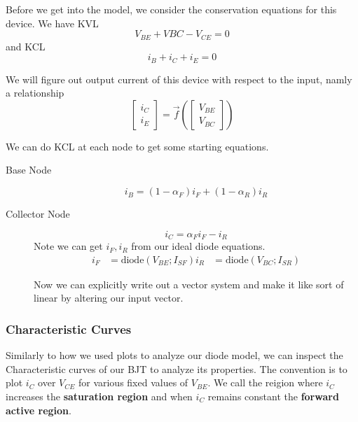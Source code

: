 \documentclass{report}
\begin{document}

Before we get into the model, we consider the conservation equations for this device. We have KVL
\begin{equation*}
    V_{BE} + V{BC} - V_{CE} = 0 %
\end{equation*}
and KCL
\begin{equation*}
    i_B + i_C + i_E = 0
\end{equation*}

We will figure out output current of this device with respect to the input, namly a relationship
\begin{equation*}
    \begin{bmatrix}
        i_C \\
        i_E
    \end{bmatrix}
    = \vec{f}
    (\begin{bmatrix}
        V_{BE} \\
        V_{BC}
    \end{bmatrix})
\end{equation*}


We can do KCL at each node to get some starting equations.

\begin{description}
    \item[Base Node] 
    \begin{equation*}
        i_B = (1 - \alpha_F)i_F + (1 - \alpha_R)i_R
    \end{equation*}
    \item[Collector Node] 
    \begin{equation*}
        i_C = \alpha_F i_F - i_R
    \end{equation*}
    Note we can get $i_F, i_R$ from our ideal diode equations.
    \begin{align*}
        i_F &= \mathrm{diode}(V_{BE}; I_{SF})
        i_R &= \mathrm{diode}(V_{BC}; I_{SR})
    \end{align*}

    Now we can explicitly write out a vector system %
    and make it like sort of linear by altering our input vector.
\end{description}

\subsubsection{Characteristic Curves}
Similarly to how we used plots to analyze our diode model, we can inspect the Characteristic curves of our BJT to analyze its properties. The convention is to plot $i_C$ over $V_{CE}$ for various fixed values of $V_{BE}$. We call the reigion where $i_C$ increases the \textbf{saturation region} and when $i_C$ remains constant the \textbf{forward active region}.
\end{document}
